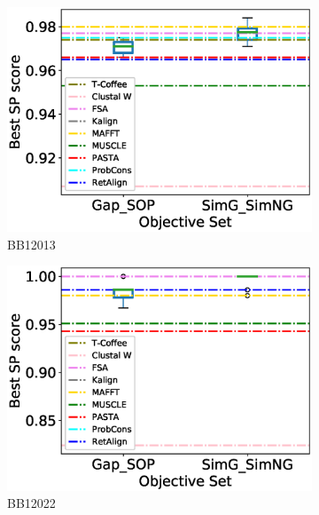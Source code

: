 \begin{figure}[!htbp]
\begin{adjustwidth}{-1.5cm}{-1cm}
\begin{subfigure}{0.22\textwidth}
			\includegraphics[width=\columnwidth]{Figure/summary/precomputedInit/Balibase/BB12013_objset_pairs_rank_2}
			\caption{BB12013}
		\end{subfigure}
		\begin{subfigure}{0.22\textwidth}
			\includegraphics[width=\columnwidth]{Figure/summary/precomputedInit/Balibase/BB12022_objset_pairs_rank_2}
			\caption{BB12022}
		\end{subfigure}
		\begin{subfigure}{0.22\textwidth}

\end{subfigure}
\end{adjustwidth}
\end{figure}

